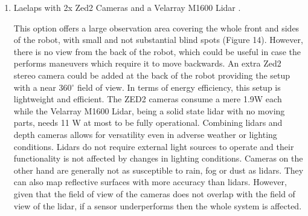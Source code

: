 \documentclass{article}
\begin{document}
\begin{enumerate}
\item Laelaps with 2x Zed2 Cameras \cite{noauthor_zed_nodate} and a Velarray M1600 Lidar \cite{noauthor_velarray_nodate}.

This option offers a large observation area covering the whole front and sides of the robot, with small and not substantial blind spots (Figure 14). However, there is no view from the back of the robot, which could be useful in case the performs maneuvers which require it to move backwards. An extra Zed2 stereo camera could be added at the back of the robot providing the setup with a near 360$^{\circ}$ field of view.
In terms of energy efficiency, this setup is lightweight and efficient. The ZED2 cameras consume a mere 1.9W each \cite{stereolabs_zed2-camera-datasheet_nodate} while the Velarray M1600 Lidar, being a solid state lidar with no moving parts, needs 11 W \cite{velodyne_lidar_robotics_2022} at most to be fully operational. Combining lidars and depth cameras allows for versatility even in adverse weather or lighting conditions. Lidars do not require external light sources to operate and their functionality is not affected by changes in lighting conditions. Cameras on the other hand are generally not as susceptible to rain, fog or dust as lidars. They can also map reflective surfaces with more accuracy than lidars. However, given that the field of view of the cameras does not overlap with the field of view of the lidar, if a sensor underperforms then the whole system is affected. 


\end{enumerate}
\end{document}
